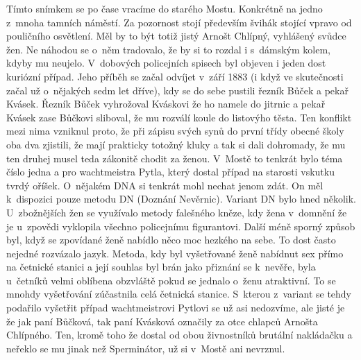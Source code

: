 
Tímto snímkem se po čase vracíme do starého Mostu. Konkrétně na jedno
z~mnoha tamních náměstí. Za pozornost stojí především švihák stojící
vpravo od pouličního osvětlení. Měl by to být totiž jistý Arnošt
Chlípný, vyhlášený svůdce žen. Ne náhodou se o~něm tradovalo, že by si
to rozdal i s~dámským kolem, kdyby mu neujelo. V~dobových policejních
spisech byl objeven i jeden dost kuriózní případ. Jeho příběh se začal
odvíjet v~září 1883 (i když ve skutečnosti začal už o~nějakých sedm let
dříve), kdy se do sebe pustili řezník Bůček a pekař Kvásek. Řezník
Bůček vyhrožoval Kváskovi že ho namele do jitrnic a pekař Kvásek zase
Bůčkovi sliboval, že mu rozválí koule do listovýho těsta. Ten konflikt
mezi nima vzniknul proto, že při zápisu svých synů do první třídy
obecné školy oba dva zjistili, že mají prakticky totožný kluky a tak
si dali dohromady, že mu ten druhej musel teda zákonitě chodit za
ženou. V~Mostě to tenkrát bylo téma číslo jedna a pro wachtmeistra
Pytla, který dostal případ na starosti vskutku tvrdý oříšek. O~nějakém
DNA si tenkrát mohl nechat jenom zdát. On měl k~dispozici pouze metodu
DN (Doznání Nevěrnic). Variant DN bylo hned několik. U~zbožnějších žen
se využívalo metody falešného kněze, kdy žena v~domnění že je
u~zpovědi vyklopila všechno policejnímu figurantovi. Další méně sporný
způsob byl, když se zpovídané ženě nabídlo něco moc hezkého na sebe.
To dost často nejedné rozvázalo jazyk. Metoda, kdy byl vyšetřované
ženě nabídnut sex přímo na četnické stanici a její souhlas byl brán
jako přiznání se k~nevěře, byla u~četníků velmi oblíbena obzvláště
pokud se jednalo o~ženu atraktivní. To se mnohdy vyšetřování
zúčastnila celá četnická stanice. S~kterou z~variant se tehdy podařilo
vyšetřit případ wachtmeistrovi Pytlovi se už asi nedozvíme, ale jisté
je že jak paní Bůčková, tak paní Kvásková označily za otce chlapců
Arnošta Chlípného. Ten, kromě toho že dostal od obou živnostníků
brutální nakládačku a neřeklo se mu jinak než Sperminátor, už si
v~Mostě ani nevrznul.

